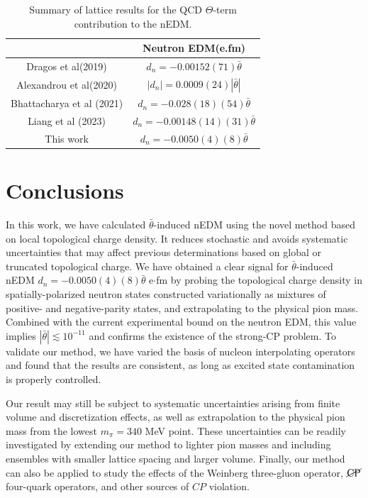 \documentclass[aps,prl,twocolumn,superscriptaddress,nofootinbib]{revtex4-2}
\newcommand{\CP}{{CP}}
\newcommand{\CPV}{{\cancel{\rm CP}}}
\begin{document}
\begin{table}[t]
    \centering
    \begin{tabular}{|c|c|} \hline
    &  Neutron EDM(e.fm)
  \\
  \hline
  Dragos et al(2019)\cite{Dragos:2019oxn}  &  $d_n=-0.00152(71)\bar{\theta}$    \\
  \hline
  Alexandrou et al(2020)\cite{Alexandrou:2020mds}  &  $|d_n|=0.0009(24)|\bar{\theta}|$  \\
  \hline  
  Bhattacharya et al (2021) \cite{Bhattacharya:2021lol} & $d_n=-0.028(18)(54)\bar{\theta}$  \\
  \hline 
  Liang et al (2023) \cite{Liang:2023jfj} & $d_n= -0.00148 (14) (31)\bar{\theta}$\\
  \hline
  This work & $d_n= -0.0050(4)(8)\bar{\theta}$ \\
 \hline 
    \end{tabular}
    \caption{Summary of lattice results for the QCD $\Theta$-term contribution to the  nEDM.}
    \label{tab:Mix}
\end{table}

\section{Conclusions}
In this work, we have calculated $\bar{\theta}$-induced nEDM using the novel method based on local topological charge density.
It reduces stochastic and avoids systematic uncertainties that may affect previous determinations based on global or truncated topological charge.
We have obtained a clear signal for $\bar{\theta}$-induced nEDM
$d_n=-0.0050(4)(8)\bar{\theta}$ e$\cdot$fm
by probing the topological charge density in spatially-polarized neutron states constructed variationally as mixtures of  positive- and negative-parity states, and extrapolating to the physical pion mass.
Combined with the current experimental bound on the neutron EDM, this value implies $|\bar{\theta}|\lesssim 10^{-11}$ and confirms the existence of the strong-CP problem.
To validate our method, we have varied the basis of nucleon interpolating operators and found that the results are consistent, as long as excited state contamination is properly controlled.

Our result may still be subject to systematic uncertainties arising from finite volume and discretization effects, as well as extrapolation to the physical pion mass from the lowest $m_\pi=340$ MeV point.
These uncertainties can be readily investigated by extending our method to lighter pion masses and including ensembles with smaller lattice spacing and larger volume.
Finally, our method can also be applied to study the effects of the Weinberg three-gluon operator, $\CPV$ four-quark operators, and other sources of $\CP$ violation.
\end{document}

